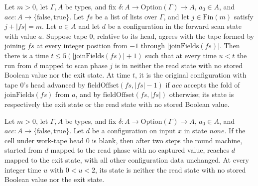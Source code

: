 \begin{theorem}
\label{Turing.rt_find_fields_run}
\leanok
{}
Let $m>0$, let $\Gamma,A$ be types, and fix $\delta:A\to\mathrm{Option}(\Gamma)\to A$,
$a_0\in A$, and $acc:A\to\{\mathrm{false},\mathrm{true}\}$. Let $fs$ be a list of
lists over $\Gamma$, and let $j\in\mathrm{Fin}(m)$ satisfy $j+|fs|=m$. Let $a\in A$ and
let $d$ be a configuration in the forward scan state with value $a$. Suppose tape $0$,
relative to its head, agrees with the tape formed by joining $fs$ at every integer
position from $-1$ through $|\mathrm{joinFields}(fs)|$. Then there is a time
$t\le5(|\mathrm{joinFields}(fs)|+1)$ such that at every time $u<t$ the run from $d$
mapped to scan phase $j$ is in neither the read state with no stored Boolean value nor
the exit state. At time $t$, it is the original configuration with tape $0$'s head
advanced by $\mathrm{fieldOffset}(fs,|fs|-1)$ if $acc$ accepts the fold of
$\mathrm{joinFields}(fs)$ from $a$, and by $\mathrm{fieldOffset}(fs,|fs|)$ otherwise;
its state is respectively the exit state or the read state with no stored Boolean value.
\end{theorem}

\begin{theorem}
\label{Turing.rt_find_blank}
\leanok
{}
Let $m>0$, let $\Gamma,A$ be types, and fix $\delta:A\to\mathrm{Option}(\Gamma)\to A$,
$a_0\in A$, and $acc:A\to\{\mathrm{false},\mathrm{true}\}$. Let $d$ be a configuration
on input $x$ in state $none$. If the cell under work-tape head $0$ is blank, then after
two steps the round machine, started from $d$ mapped to the read phase with no captured
value, reaches $d$ mapped to the exit state, with all other configuration data
unchanged. At every integer time $u$ with $0<u<2$, its state is neither the read state
with no stored Boolean value nor the exit state.
\end{theorem}

